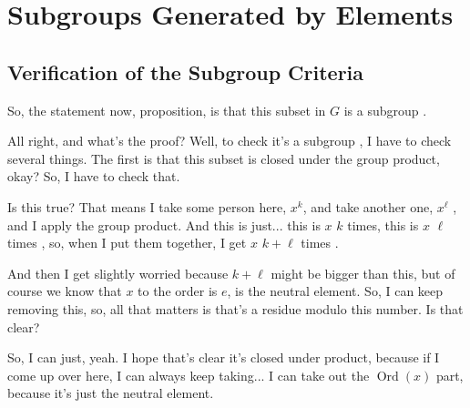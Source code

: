 
\begin{content}
\end{content}

\section{Subgroups Generated by Elements}

\subsection{Verification of the Subgroup Criteria}

\begin{speech}[00:04:06 - 00:05:35]
So, the statement now, proposition, is that this subset in $G$ is a subgroup .

All right, and what's the proof? Well, to check it's a subgroup , I have to check several things. The first is that this subset is closed under the group product, okay? So, I have to check that.

Is this true? That means I take some person here, $x^k$, and take another one, $x^\ell$ , and I apply the group product. And this is just... this is $x$ $k$ times, this is $x$ $\ell$ times , so, when I put them together, I get $x$ $k+\ell$ times .

And then I get slightly worried because $k+\ell$ might be bigger than this, but of course we know that $x$ to the order  is $e$, is the neutral element. So, I can keep removing this, so, all that matters is that's a residue modulo this number. Is that clear?

So, I can just, yeah. I hope that's clear it's closed under product, because if I come up over here, I can always keep taking... I can take out the $\operatorname{Ord}(x)$ part, because it's just the neutral element.
\end{speech}

